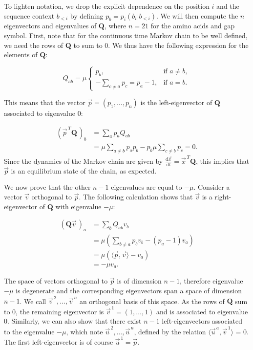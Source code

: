 To lighten notation, we drop the explicit dependence on the position $i$ and the sequence context $b_{<i}$ by defining $p_b = p_i(b_i \vert b_{<i})$.
We will then compute the $n$ eigenvectors and eigenvalues of $\mathbf{Q}$, where $n = 21$ for the amino acids and gap symbol. 
First, note that for the continuous time Markov chain to be well defined, we need the rows of $\mathbf{Q}$ to sum to $0$. 
We thus have the following expression for the elements of $\mathbf{Q}$: 

$$
Q_{ab} = \mu \begin{cases}
			p_b, & \text{if $a \neq b$},\\
            -\sum_{c\neq a} p_c = p_a - 1, & \text{if $a = b$}.
		 \end{cases}
$$

This means that the vector $\vec{p} = (p_1, \ldots, p_n)$ is the left-eigenvector of $\mathbf{Q}$ associated to eigenvalue $0$:

\begin{align*}
	\left(\vec{p}^{\,T}\mathbf{Q}\,\right)_b &= \sum_a p_a Q_{ab}\\ 
	&= \mu\sum_{a\neq b} p_a p_b - p_b \mu \sum_{c\neq b} p_c = 0.
\end{align*}
Since the dynamics of the Markov chain are given by $\frac{\text{d}\vec{x}}{\text{d}t} = \vec{x}^{\,T} \mathbf{Q}$, this implies that $\vec{p}$ is an equilibrium state of the chain, as expected. 

We now prove that the other $n-1$ eigenvalues are equal to $-\mu$. 
Consider a vector $\vec{v}$ orthogonal to $\vec{p}$. 
The following calculation shows that $\vec{v}$ is a right-eigenvector of $\mathbf{Q}$ with eigenvalue $-\mu$: 

\begin{equation}
\begin{split}
	\left(\mathbf{Q} \vec{v}\,\right)_a &= \sum_b Q_{ab} v_b\\
	&= \mu\left( \sum_{b\neq a} p_b v_b - (p_a - 1)v_a \right)\\
	&= \mu\left( \langle\vec{p}, \vec{v}\rangle - v_a \right)\\
	&= -\mu v_a.
\end{split}
\end{equation}

The space of vectors orthogonal to $\vec{p}$ is of dimension $n-1$, therefore eigenvalue $-\mu$ is degenerate and the corresponding eigenvectors span a space of dimension $n-1$. 
We call $\vec{v}^{\,2}, \ldots, \vec{v}^{\,n}$ an orthogonal basis of this space. 
As the rows of $\mathbf{Q}$ sum to $0$, the remaining eigenvector is $\vec{v}^{\,1} = (1, \ldots, 1)$ and is associated to eigenvalue $0$. 
Similarly, we can also show that there exist $n-1$ left-eigenvectors associated to the eigenvalue $-\mu$, which note $\vec{u}^{\,2}, \ldots, \vec{u}^{\,n}$, defined by the relation $\langle\vec{u}^{\,a}, \vec{v}^{\,1}\rangle$ = 0. 
The first left-eigenvector is of course $\vec{u}^{\,1} = \vec{p}$. 

